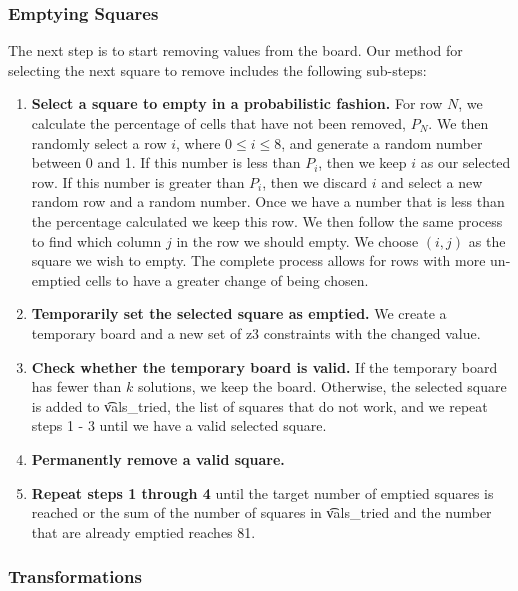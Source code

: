 \subsubsection{Emptying Squares}

The next step is to start removing values from the board. Our method for
selecting the next square to remove includes the following
sub-steps:

\begin{enumerate}
\item {\bf Select a square to empty in a probabilistic fashion.} For row $N$, we calculate the percentage of cells that have not been removed, $P_N$. We then randomly select a row $i$, where $0 \le i \le 8$, and generate a random number between 0 and 1. If this number is less than $P_i$, then we keep $i$ as our selected row. If this number is greater than $P_i$, then we discard $i$ and select a new random row and a random number. Once we have a number that is less than the percentage calculated we keep this row. We then follow the same process to find which column $j$ in the row we should empty. We choose $(i, j)$ as the square we wish to empty. The complete process allows for rows with more un-emptied cells to have a greater change of being chosen.
\item {\bf Temporarily set the selected square as emptied.} We create a temporary board and a new set of z3 constraints with the changed value.
\item{\bf Check whether the temporary board is valid.} If the temporary board has fewer than $k$ solutions, we keep the board. Otherwise, the selected square is added to \t{vals\_tried}, the list of squares that do not work, and we repeat steps 1 - 3 until we have a valid selected square.
\item{\bf Permanently remove a valid square.}
\item{\bf Repeat steps 1 through 4} until the target number of emptied squares is reached or the sum of the number of squares in \t{vals\_tried} and the number that are already emptied reaches 81. 
\end{enumerate}

\subsubsection{Transformations}

